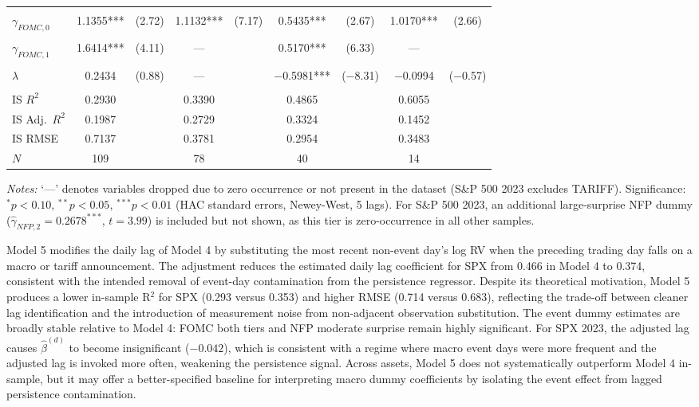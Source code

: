 \documentclass[12pt,a4paper]{report}
\begin{document}
\begin{table}[H]
\begin{threeparttable}
{\begin{tabular}{lcccccccc}
                        & & & & & & & & \\
$\gamma_{FOMC,0}$       & 1.1355*** & (2.72) & 1.1132*** & (7.17) & 0.5435*** & (2.67) & 1.0170*** & (2.66) \\
                        & & & & & & & & \\
$\gamma_{FOMC,1}$       & 1.6414*** & (4.11) & --- & & 0.5170*** & (6.33) & --- & \\
                        & & & & & & & & \\
$\lambda$               & 0.2434 & (0.88) & --- & & $-$0.5981*** & ($-$8.31) & $-$0.0994 & ($-$0.57) \\
                        & & & & & & & & \\
\midrule
IS $R^2$       & 0.2930 & & 0.3390 & & 0.4865 & & 0.6055 & \\
IS Adj.\ $R^2$ & 0.1987 & & 0.2729 & & 0.3324 & & 0.1452 & \\
IS RMSE        & 0.7137 & & 0.3781 & & 0.2954 & & 0.3483 & \\
$N$            & 109 & & 78 & & 40 & & 14 & \\
\bottomrule
\end{tabular}
}
\begin{tablenotes}[flushleft]
\footnotesize
\item \textit{Notes:} `---' denotes variables dropped due to zero occurrence or not present in the dataset (S\&P 500 2023 excludes TARIFF). Significance: $^{*}p<0.10$, $^{**}p<0.05$, $^{***}p<0.01$ (HAC standard errors, Newey-West, 5 lags). For S\&P 500 2023, an additional large-surprise NFP dummy ($\hat{\gamma}_{NFP,2} = 0.2678^{***}$, $t = 3.99$) is included but not shown, as this tier is zero-occurrence in all other samples.
\end{tablenotes}
\end{threeparttable}
\end{table}

Model 5 modifies the daily lag of Model 4 by substituting the most recent non-event day's log RV when the preceding trading day falls on a macro or tariff announcement. The adjustment reduces the estimated daily lag coefficient for SPX from 0.466 in Model 4 to 0.374, consistent with the intended removal of event-day contamination from the persistence regressor. Despite its theoretical motivation, Model 5 produces a lower in-sample R$^2$ for SPX (0.293 versus 0.353) and higher RMSE (0.714 versus 0.683), reflecting the trade-off between cleaner lag identification and the introduction of measurement noise from non-adjacent observation substitution. The event dummy estimates are broadly stable relative to Model 4: FOMC both tiers and NFP moderate surprise remain highly significant. For SPX 2023, the adjusted lag causes $\hat{\beta}^{(d)}$ to become insignificant ($-0.042$), which is consistent with a regime where macro event days were more frequent and the adjusted lag is invoked more often, weakening the persistence signal. Across assets, Model 5 does not systematically outperform Model 4 in-sample, but it may offer a better-specified baseline for interpreting macro dummy coefficients by isolating the event effect from lagged persistence contamination.
\end{document}
